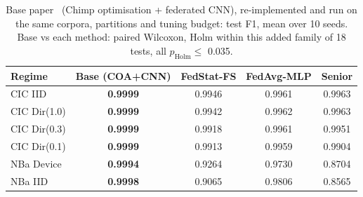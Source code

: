 \begin{table}[t]
\centering
\caption{Base paper~\cite{karunamurthy2025} (Chimp optimisation + federated CNN), re-implemented and run on the same corpora, partitions and tuning budget: test F1, mean over 10 seeds. Base vs each method: paired Wilcoxon, Holm within this added family of 18 tests, all $p_{\mathrm{Holm}}\le$ 0.035.}
\label{tab:base}
\scriptsize
\setlength{\tabcolsep}{3pt}
\begin{tabular}{lcccc}
\toprule
Regime & Base (COA+CNN) & FedStat-FS & FedAvg-MLP & Senior \\
\midrule
CIC IID & \textbf{0.9999} & 0.9946 & 0.9961 & 0.9963 \\
CIC Dir(1.0) & \textbf{0.9999} & 0.9942 & 0.9962 & 0.9963 \\
CIC Dir(0.3) & \textbf{0.9999} & 0.9918 & 0.9961 & 0.9951 \\
CIC Dir(0.1) & \textbf{0.9999} & 0.9913 & 0.9959 & 0.9904 \\
NBa Device & \textbf{0.9994} & 0.9264 & 0.9730 & 0.8704 \\
NBa IID & \textbf{0.9998} & 0.9065 & 0.9806 & 0.8565 \\
\bottomrule
\end{tabular}
\end{table}
